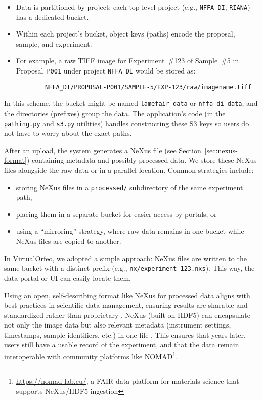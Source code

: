 \begin{itemize}
	\item Data is partitioned by project: each top-level project 
	(e.g., \texttt{NFFA\_DI}, \texttt{RIANA}) has a dedicated bucket.  
	\item Within each project’s bucket, object keys (paths) encode the proposal, 
	sample, and experiment.  
	\item For example, a raw TIFF image for Experiment~\#123 of Sample~\#5 in 
	Proposal~\texttt{P001} under project \texttt{NFFA\_DI} would be stored as:  
	\begin{verbatim}
		NFFA_DI/PROPOSAL-P001/SAMPLE-5/EXP-123/raw/imagename.tiff
	\end{verbatim}
\end{itemize}

In this scheme, the bucket might be named \texttt{lamefair-data} or 
\texttt{nffa-di-data}, and the directories (prefixes) group the data. The 
application’s code (in the \texttt{pathing.py} and \texttt{s3.py} utilities) 
handles constructing these S3 keys so users do not have to worry about the exact 
paths.

\medskip

After an upload, the system generates a NeXus file (see Section~\ref{sec:nexus-format}) 
containing metadata and possibly processed data. We store these NeXus files 
alongside the raw data or in a parallel location. Common strategies include:  

\begin{itemize}
	\item storing NeXus files in a \texttt{processed/} subdirectory of the same 
	experiment path,  
	\item placing them in a separate bucket for easier access by portals, or  
	\item using a ``mirroring'' strategy, where raw data remains in one bucket 
	while NeXus files are copied to another.  
\end{itemize}

In VirtualOrfeo, we adopted a simple approach: NeXus files are written to the 
same bucket with a distinct prefix (e.g., \texttt{nx/experiment\_123.nxs}). This 
way, the data portal or UI can easily locate them.

\medskip

Using an open, self-describing format like NeXus for processed data aligns with 
best practices in scientific data management, ensuring results are sharable and 
standardized rather than proprietary \parencite{Koennecke2015NeXusFormat, 
	Korir2024TenRecs}. NeXus (built on HDF5) can encapsulate not only the image data 
but also relevant metadata (instrument settings, timestamps, sample identifiers, 
etc.) in one file \parencite{Koennecke2015NeXusFormat}. This ensures that years 
later, users still have a usable record of the experiment, and that the data 
remain interoperable with community platforms like NOMAD\footnote{\url{https://nomad-lab.eu/}, 
	a FAIR data platform for materials science that supports NeXus/HDF5 ingestion}.

